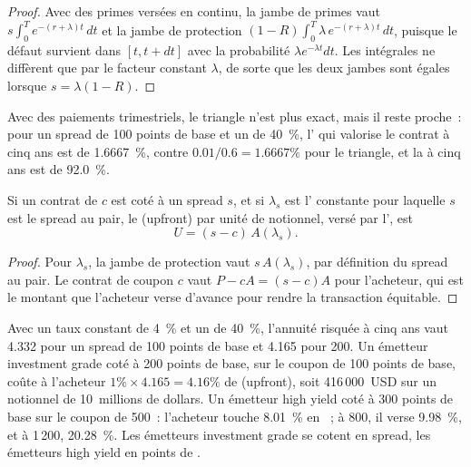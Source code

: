 \begin{proof}
Avec des primes versées en continu, la jambe de primes vaut $s\int_0^T e^{-(r+\lambda)t}\,dt$
et la jambe de protection $(1-R)\int_0^T \lambda\,e^{-(r+\lambda)t}\,dt$, puisque le défaut
survient dans $[t, t+dt]$ avec la probabilité $\lambda e^{-\lambda t}dt$. Les intégrales
ne diffèrent que par le facteur constant $\lambda$, de sorte que les deux jambes sont égales lorsque $s =
\lambda(1-R)$.
\end{proof}

Avec des paiements trimestriels, le triangle n'est plus exact, mais il reste proche~: pour un spread de
100 points de base et un  de 40~\%, l' qui valorise le
contrat à cinq ans est de 1.6667~\%, contre $0.01/0.6 = 1.6667\%$ pour le triangle, et
la  à cinq ans est de 92.0~\%.

\begin{proposition}\label{prop:m2:credit-default-swaps:upfront}
Si un contrat de  $c$ est coté à un spread $s$, et si $\lambda_s$ est
l' constante pour laquelle $s$ est le spread au pair, le  (upfront) par unité
de notionnel, versé par l', est
\[
U = (s - c)\,A(\lambda_s).
\]
\end{proposition}

\begin{proof}
Pour $\lambda_s$, la jambe de protection vaut $s\,A(\lambda_s)$, par définition du
spread au pair. Le contrat de coupon $c$ vaut $P - cA = (s - c)A$ pour l'acheteur,
qui est le montant que l'acheteur verse d'avance pour rendre la transaction équitable.
\end{proof}

\begin{example}\label{ex:m2:credit-default-swaps:upfront}
Avec un taux constant de 4~\% et un  de 40~\%, l'annuité risquée à cinq ans vaut 4.332
pour un spread de 100 points de base et 4.165 pour 200. Un émetteur investment grade coté à
200 points de base, sur le coupon de 100 points de base, coûte à l'acheteur $1\% \times 4.165 =
4.16\%$ de  (upfront), soit 416\,000~USD sur un notionnel de 10~millions de dollars. Un émetteur high yield coté à 300
points de base sur le coupon de 500~: l'acheteur touche 8.01~\% en ~; à 800, il verse
9.98~\%, et à 1\,200, 20.28~\%. Les émetteurs investment grade se cotent en spread,
les émetteurs high yield en points de .
\end{example}

